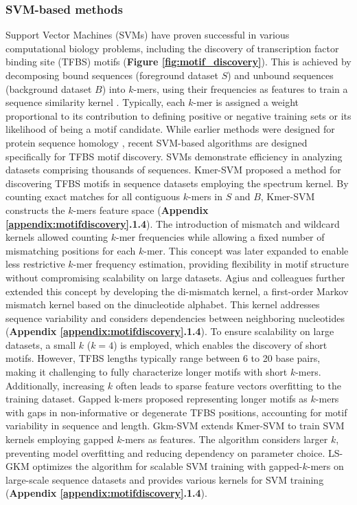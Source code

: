 \documentclass[a4paper, titlepage, openright]{book}
\begin{document}
\subsubsection{SVM-based methods}
Support Vector Machines (SVMs) \citep{boser1992training} have proven successful in various computational biology problems, including the discovery of transcription factor binding site (TFBS) motifs (\textbf{Figure \ref{fig:motif_discovery}}). This is achieved by decomposing bound sequences (foreground dataset $S$) and unbound sequences (background dataset $B$) into $k$-mers, using their frequencies as features to train a sequence similarity kernel \citep{ben2008support}. Typically, each $k$-mer is assigned a weight proportional to its contribution to defining positive or negative training sets or its likelihood of being a motif candidate. While earlier methods were designed for protein sequence homology \citep{leslie2001spectrum,eskin2002mismatch,kuang2005profile}, recent SVM-based algorithms are designed specifically for TFBS motif discovery. SVMs demonstrate efficiency in analyzing datasets comprising thousands of sequences. Kmer-SVM \citep{lee2011discriminative,fletez2013kmer} proposed a method for discovering TFBS motifs in sequence datasets employing the spectrum kernel. By counting exact matches for all contiguous $k$-mers in $S$ and $B$, Kmer-SVM constructs the $k$-mers feature space (\textbf{Appendix \ref{appendix:motifdiscovery}.1.4}). The introduction of mismatch \citep{kuang2005profile} and wildcard \citep{leslie2003fast} kernels allowed counting $k$-mer frequencies while allowing a fixed number of mismatching positions for each $k$-mer. This concept was later expanded to enable less restrictive $k$-mer frequency estimation, providing flexibility in motif structure without compromising scalability on large datasets. Agius and colleagues \citep{agius2010high} further extended this concept by developing the di-mismatch kernel, a first-order Markov mismatch kernel based on the dinucleotide alphabet. This kernel addresses sequence variability and considers dependencies between neighboring nucleotides (\textbf{Appendix \ref{appendix:motifdiscovery}.1.4}). To ensure scalability on large datasets, a small $k$ ($k=4$) is employed, which enables the discovery of short motifs. However, TFBS lengths typically range between 6 to 20 base pairs, making it challenging to fully characterize longer motifs with short $k$-mers. Additionally, increasing $k$ often leads to sparse feature vectors overfitting to the training dataset. Gapped k-mers \citep{ghandi2014robust} proposed representing longer motifs as $k$-mers with gaps in non-informative or degenerate TFBS positions, accounting for motif variability in sequence and length. Gkm-SVM \citep{ghandi2014enhanced,ghandi2016gkmsvm} extends Kmer-SVM to train SVM kernels employing gapped $k$-mers as features. The algorithm considers larger $k$, preventing model overfitting and reducing dependency on parameter choice. LS-GKM \citep{lee2016ls} optimizes the algorithm for scalable SVM training with gapped-$k$-mers on large-scale sequence datasets and provides various kernels for SVM training (\textbf{Appendix \ref{appendix:motifdiscovery}.1.4}).
\end{document}
